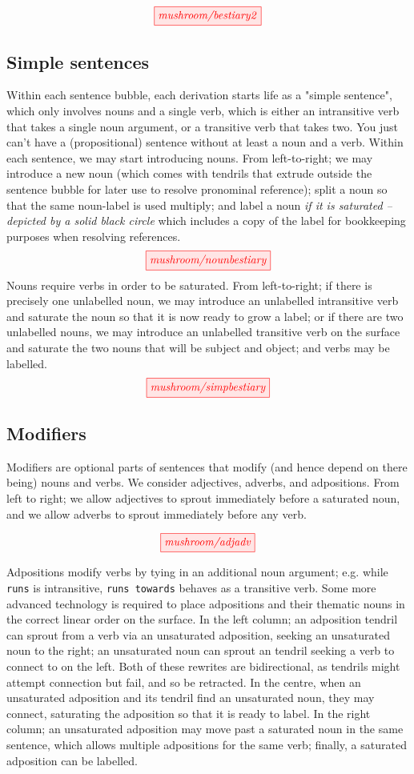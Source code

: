 \begin{fullwidth}
\[
\tikzfig{mushroom/bestiary2}
\]

\subsection{Simple sentences}
Within each sentence bubble, each derivation starts life as a "simple sentence", which only involves nouns and a single verb, which is either an intransitive verb that takes a single noun argument, or a transitive verb that takes two. You just can't have a (propositional) sentence without at least a noun and a verb. Within each sentence, we may start introducing nouns. From left-to-right; we may introduce a new noun (which comes with tendrils that extrude outside the sentence bubble for later use to resolve pronominal reference); split a noun so that the same noun-label is used multiply; and label a noun \emph{if it is saturated -- depicted by a solid black circle} which includes a copy of the label for bookkeeping purposes when resolving references.
\[
\tikzfig{mushroom/nounbestiary}
\]
Nouns require verbs in order to be saturated. From left-to-right; if there is precisely one unlabelled noun, we may introduce an unlabelled intransitive verb and saturate the noun so that it is now ready to grow a label; or if there are two unlabelled nouns, we may introduce an unlabelled transitive verb on the surface and saturate the two nouns that will be subject and object; and verbs may be labelled.
\[
\tikzfig{mushroom/simpbestiary}
\]

\subsection{Modifiers}

Modifiers are optional parts of sentences that modify (and hence depend on there being) nouns and verbs. We consider adjectives, adverbs, and adpositions. From left to right; we allow adjectives to sprout immediately before a saturated noun, and we allow adverbs to sprout immediately before any verb.

\[
\tikzfig{mushroom/adjadv}
\]

Adpositions modify verbs by tying in an additional noun argument; e.g. while \texttt{runs} is intransitive, \texttt{runs towards} behaves as a transitive verb. Some more advanced technology is required to place adpositions and their thematic nouns in the correct linear order on the surface. In the left column; an adposition tendril can sprout from a verb via an unsaturated adposition, seeking an unsaturated noun to the right; an unsaturated noun can sprout an tendril seeking a verb to connect to on the left. Both of these rewrites are bidirectional, as tendrils might attempt connection but fail, and so be retracted. In the centre, when an unsaturated adposition and its tendril find an unsaturated noun, they may connect, saturating the adposition so that it is ready to label. In the right column; an unsaturated adposition may move past a saturated noun in the same sentence, which allows multiple adpositions for the same verb; finally, a saturated adposition can be labelled.


\end{fullwidth}
